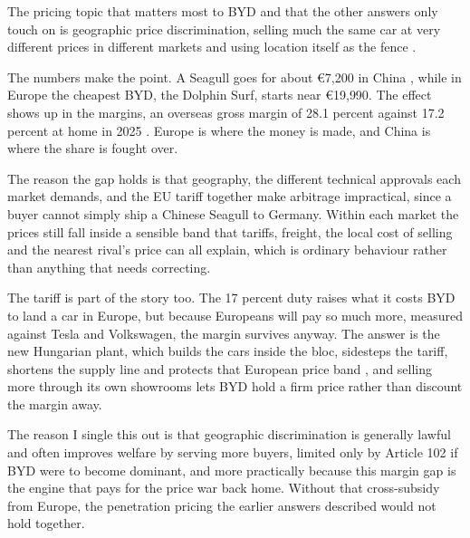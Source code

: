 
The pricing topic that matters most to BYD and that the other answers only touch on is geographic price discrimination, selling much the same car at very different prices in different markets and using location itself as the fence \cite{nagle2018}.

The numbers make the point. A Seagull goes for about \euro7{,}200 in China \cite{electrekSeagull}, while in Europe the cheapest BYD, the Dolphin Surf, starts near \euro19{,}990. The effect shows up in the margins, an overseas gross margin of 28.1 percent against 17.2 percent at home in 2025 \cite{byd2025}. Europe is where the money is made, and China is where the share is fought over.

The reason the gap holds is that geography, the different technical approvals each market demands, and the EU tariff together make arbitrage impractical, since a buyer cannot simply ship a Chinese Seagull to Germany. Within each market the prices still fall inside a sensible band that tariffs, freight, the local cost of selling and the nearest rival's price can all explain, which is ordinary behaviour rather than anything that needs correcting.

The tariff is part of the story too. The 17 percent duty raises what it costs BYD to land a car in Europe, but because Europeans will pay so much more, measured against Tesla and Volkswagen, the margin survives anyway. The answer is the new Hungarian plant, which builds the cars inside the bloc, sidesteps the tariff, shortens the supply line and protects that European price band \cite{fortuneHungary}, and selling more through its own showrooms lets BYD hold a firm price rather than discount the margin away.

The reason I single this out is that geographic discrimination is generally lawful and often improves welfare by serving more buyers, limited only by Article 102 if BYD were to become dominant, and more practically because this margin gap is the engine that pays for the price war back home. Without that cross-subsidy from Europe, the penetration pricing the earlier answers described would not hold together.